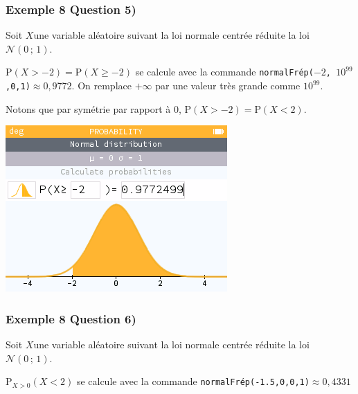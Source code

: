 \documentclass[xcolor=svgnames,t,final]{beamer}
\begin{document}
\begin{frame}
\frametitle{Exemple 8 Question 5)}


Soit  $X $une variable aléatoire suivant la loi normale centrée réduite la loi $\mathcal{N}\left(0 \, ; \, 1\right)$.




 $\text{P}\left(  X  > -2  \right)=\text{P}\left(  X  \geqslant -2  \right)$  se calcule avec la commande \texttt{normalFrép($-2$, $10^{99}$,0,1)}$\approx  0,9772$. On remplace $+\infty$ par une valeur très grande comme $10^{99}$.
 
Notons que par symétrie par rapport à $0$, $\text{P}\left(  X  > -2  \right)= \text{P}\left(  X  < 2 \right)  $.


\begin{center}
\includegraphics[scale=0.3]{images/exemple8-fig5.png}
\end{center}

\end{frame}

\begin{frame}
\frametitle{Exemple 8 Question 6)}


Soit  $X $une variable aléatoire suivant la loi normale centrée réduite la loi $\mathcal{N}\left(0 \, ; \, 1\right)$.


$\text{P}_{X>0} \left( X <2\right)$   se calcule avec la commande \texttt{normalFrép(-1.5,0,0,1)}$\approx  0,4331$


\end{frame}
\end{document}
